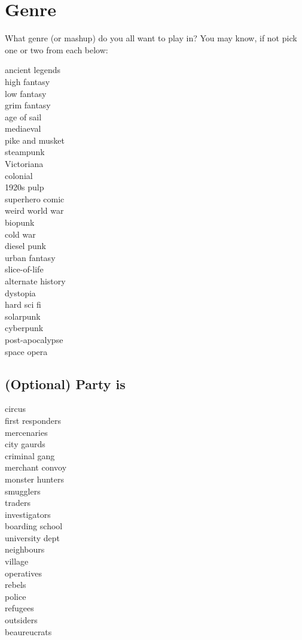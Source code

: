\documentclass{tufte-handout}
\begin{document}
\section{Genre}
What genre (or mashup) do you all want to play in?
You may know, if not pick one or two from each below:
\begin{multicols}{3}
ancient legends\\
high fantasy\\
low fantasy\\
grim fantasy\\
age of sail\\
mediaeval\\
pike and musket\\
steampunk\\
Victoriana\\
colonial\\
1920s pulp\\
superhero comic\\
weird world war\\
biopunk\\
cold war\\
diesel punk\\
urban fantasy\\
slice-of-life\\
alternate history\\
dystopia\\
hard sci fi\\
solarpunk\\
cyberpunk\\
post-apocalypse\\
space opera\\
\end{multicols}

\subsection{(Optional) Party is}
\begin{multicols}{3}
circus\\
first responders\\
mercenaries\\
city gaurds\\
criminal gang\\
merchant convoy\\
monster hunters\\
smugglers\\
traders\\
investigators\\
boarding school\\
university dept\\
neighbours\\
village\\
operatives\\
rebels\\
police\\
refugees\\
outsiders\\
beaureucrats\\
\end{multicols}
\end{document}
